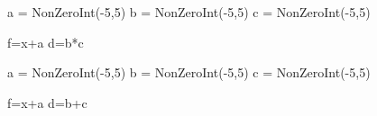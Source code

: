 


%
%
%
%
%
%
%
%
%
%
%
%
%
%
%
%
%
%
%
%
%

\begin{sagesilent}
a = NonZeroInt(-5,5)
b = NonZeroInt(-5,5)
c = NonZeroInt(-5,5)

f=x+a
d=b*c
\end{sagesilent}


\begin{sagesilent}
a = NonZeroInt(-5,5)
b = NonZeroInt(-5,5)
c = NonZeroInt(-5,5)

f=x+a
d=b+c
\end{sagesilent}

